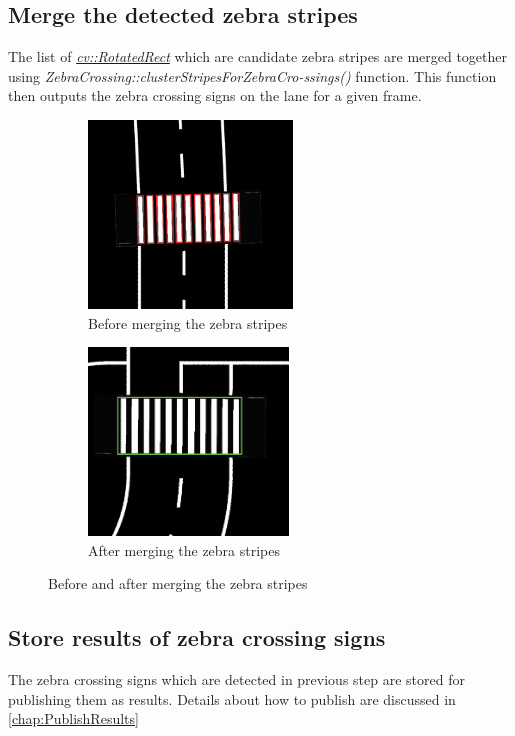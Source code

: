 \subsection{Merge the detected zebra stripes}
The list of \href{https://docs.opencv.org/3.4.3/db/dd6/classcv_1_1RotatedRect.html}{\emph{cv::RotatedRect}} which are candidate zebra stripes are merged together using \emph{ZebraCrossing::clusterStripesForZebraCro-ssings()} function. This function then outputs the zebra crossing signs on the lane for a given frame.
\begin{figure}[ht]
\begin{subfigure}{0.5\textwidth}
\centering
\includegraphics[width=0.9\linewidth,height=5cm]{images/UnmergedZebraStripes.jpeg} 
\caption{Before merging the zebra stripes}
\end{subfigure}
\begin{subfigure}{0.5\textwidth}
\centering
\includegraphics[width=0.9\linewidth,height=5cm]{images/MergedZebraStripes.jpeg} 
\caption{After merging the zebra stripes}
\end{subfigure}
\caption{Before and after merging the zebra stripes}
\label{fig:BeforeAfterMergingZebraStripes}
\end{figure}

\subsection{Store results of zebra crossing signs}
\label{sec:ZebraCrossStoreResults}
The zebra crossing signs which are detected in previous step are stored for publishing them as results. Details about how to publish are discussed in \autoref{chap:PublishResults}


